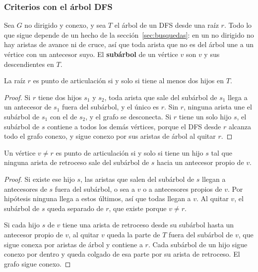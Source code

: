 \documentclass[11pt,letterpaper]{article}
\begin{document}
\subsubsection*{Criterios con el árbol DFS}

Sea $G$ no dirigido y conexo, y sea $T$ el árbol de un DFS desde una
raíz $r$. Todo lo que sigue depende de un hecho de la
sección~\ref{sec:busquedas}: en un no dirigido no hay aristas de avance
ni de cruce, así que toda arista que no es del árbol une a un vértice
con un antecesor suyo. El \textbf{subárbol} de un vértice $v$ son $v$ y
sus descendientes en $T$.

\begin{proposicion}
  \label{prop:raiz-articulacion}
  La raíz $r$ es punto de articulación si y solo si tiene al menos dos
  hijos en $T$.
\end{proposicion}

\begin{proof}
  Si $r$ tiene dos hijos $s_1$ y $s_2$, toda arista que sale del
  subárbol de $s_1$ llega a un antecesor de $s_1$ fuera del subárbol,
  y el único es $r$. Sin $r$, ninguna arista une el subárbol de $s_1$
  con el de $s_2$, y el grafo se desconecta. Si $r$ tiene un solo hijo
  $s$, el subárbol de $s$ contiene a todos los demás vértices, porque
  el DFS desde $r$ alcanza todo el grafo conexo, y sigue conexo por sus
  aristas de árbol al quitar $r$.
\end{proof}

\begin{proposicion}
  \label{prop:hijo-articulacion}
  Un vértice $v \neq r$ es punto de articulación si y solo si tiene un
  hijo $s$ tal que ninguna arista de retroceso sale del subárbol de $s$
  hacia un antecesor propio de $v$.
\end{proposicion}

\begin{proof}
  Si existe ese hijo $s$, las aristas que salen del subárbol de $s$
  llegan a antecesores de $s$ fuera del subárbol, o sea a $v$ o a
  antecesores propios de $v$. Por hipótesis ninguna llega a estos
  últimos, así que todas llegan a $v$. Al quitar $v$, el subárbol de
  $s$ queda separado de $r$, que existe porque $v \neq r$.

  Si cada hijo $s$ de $v$ tiene una arista de retroceso desde su
  subárbol hasta un antecesor propio de $v$, al quitar $v$ queda la
  parte de $T$ fuera del subárbol de $v$, que sigue conexa por aristas
  de árbol y contiene a $r$. Cada subárbol de un hijo sigue conexo por
  dentro y queda colgado de esa parte por su arista de retroceso. El
  grafo sigue conexo.
\end{proof}
\end{document}
